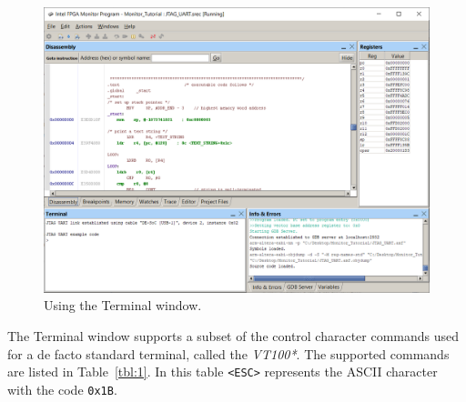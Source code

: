 \documentclass[11pt, twoside, pdftex]{article}
\begin{document}
\begin{figure}[H]
   \begin{center}
      \includegraphics[scale=0.6]{screenshots/figure22.png}
   \end{center}
   \caption{Using the Terminal window.}
	 \label{fig:22}
\end{figure}

\newpage
The Terminal window supports a subset of the control character commands
used for a de facto standard terminal, called the {\it VT100*}.
The supported commands are listed in Table~\ref{tbl:1}. In this table
\texttt{<ESC>} represents the ASCII character with the code
\texttt{0x1B}.
\end{document}
